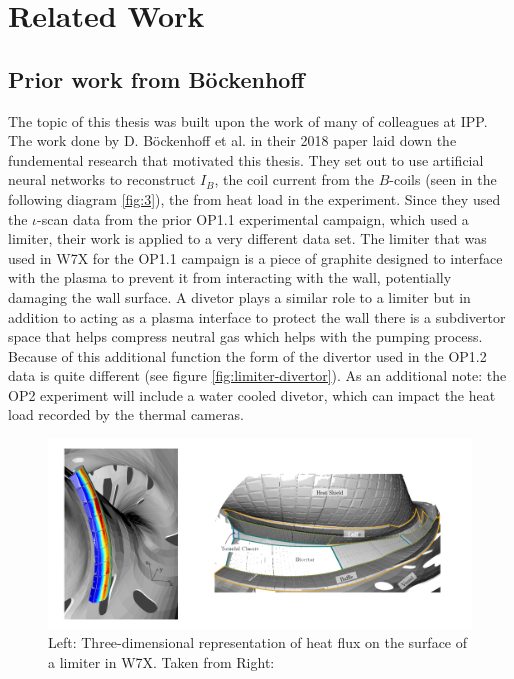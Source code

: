 %
\chapter{Related Work}
\label{sec:related}

\section{Prior work from Böckenhoff}

The topic of this thesis was built upon the work of many of colleagues at IPP. The work done by D. Böckenhoff et al. in their 2018 paper \cite{Böckenhoff_2018} laid down the fundemental research that motivated this thesis. They set out to use artificial neural networks to reconstruct $I_B$, the coil current from the $B$-coils (seen in the following diagram \ref{fig:3}), the from heat load in the experiment. Since they used the $\iota$-scan data from the prior OP1.1 experimental campaign, which used a limiter, their work is applied to a very different data set. The limiter that was used in W7X for the OP1.1 campaign is a piece of graphite designed to interface with the plasma to prevent it from interacting with the wall, potentially damaging the wall surface. A divetor plays a similar role to a limiter but in addition to acting as a plasma interface to protect the wall there is a subdivertor space that helps compress neutral gas which helps with the pumping process. Because of this additional function the form of the divertor used in the OP1.2 data is quite different (see figure \ref{fig:limiter-divertor}). As an additional note: the OP2 experiment will include a water cooled divetor, which can impact the heat load recorded by the thermal cameras.

\begin{figure}[!htb]
	\centering
	\includegraphics[width = \textwidth]{images/limiter-divetor.png}
	\caption{Left: Three-dimensional representation of heat flux on the surface of a limiter in W7X. Taken from \cite{Böckenhoff_2018} Right: } \label{fig:limiter-divetor}
\end{figure}

